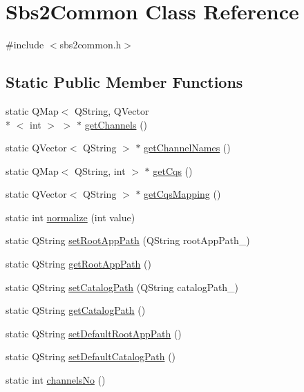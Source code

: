 \hypertarget{classSbs2Common}{\section{Sbs2\-Common Class Reference}
\label{classSbs2Common}
}


{\ttfamily \#include $<$sbs2common.\-h$>$}

\subsection*{Static Public Member Functions}
\begin{DoxyCompactItemize}
\item 
static Q\-Map$<$ Q\-String, Q\-Vector\\*
$<$ int $>$ $>$ $\ast$ \hyperlink{classSbs2Common_abe359b89c847faf981edbdc489f4595e}{get\-Channels} ()
\item 
static Q\-Vector$<$ Q\-String $>$ $\ast$ \hyperlink{classSbs2Common_a26b4bf6379a9cee45e35e07c19b4aa2c}{get\-Channel\-Names} ()
\item 
static Q\-Map$<$ Q\-String, int $>$ $\ast$ \hyperlink{classSbs2Common_a9ee578e4cabcf616c88d0db8f0d567be}{get\-Cqs} ()
\item 
static Q\-Vector$<$ Q\-String $>$ $\ast$ \hyperlink{classSbs2Common_a8c381af4f269d3b95516c28a54a3da27}{get\-Cqs\-Mapping} ()
\item 
static int \hyperlink{classSbs2Common_ae34d3957e094ce7c8f8a4c5290862987}{normalize} (int value)
\item 
static Q\-String \hyperlink{classSbs2Common_a1c03f01f6746885e32e3cfe554e2b5b4}{set\-Root\-App\-Path} (Q\-String root\-App\-Path\-\_\-)
\item 
static Q\-String \hyperlink{classSbs2Common_a1e31a4a195281804065dfc4653702d84}{get\-Root\-App\-Path} ()
\item 
static Q\-String \hyperlink{classSbs2Common_a7cde3b21f5e2c4606cfa92ae2050cf95}{set\-Catalog\-Path} (Q\-String catalog\-Path\-\_\-)
\item 
static Q\-String \hyperlink{classSbs2Common_a6ee1defc22504c921fdbd1134318c84a}{get\-Catalog\-Path} ()
\item 
static Q\-String \hyperlink{classSbs2Common_a94ab9efc9b6a6561b573cf6907c96ee6}{set\-Default\-Root\-App\-Path} ()
\item 
static Q\-String \hyperlink{classSbs2Common_a6967f3ce47bdd7aff650ca941727bb05}{set\-Default\-Catalog\-Path} ()
\item 
static int \hyperlink{classSbs2Common_ad68c665f63d9c841ff164c83205add76}{channels\-No} ()

\end{DoxyCompactItemize}
